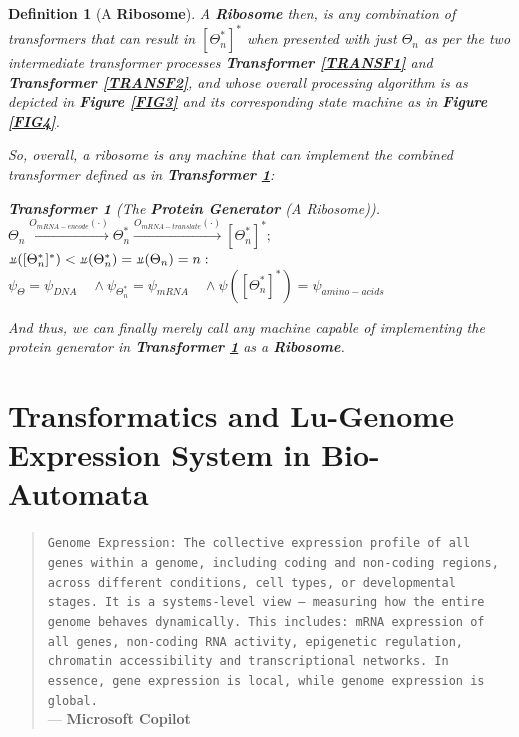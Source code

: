 \documentclass[a4paper, 18pt]{book} %
\newtheorem{defn}{Definition}
\newtheorem{transf}{Transformer}
\newcommand{\invpi}{\rotatebox[origin=c]{180}{$\pi$}}
\begin{document}
\begin{defn}[A \textbf{Ribosome}]
A \textbf{Ribosome} then, is any combination of transformers that can result in $[\Theta^*_n]^*$ when presented with just $\Theta_n$ as per the two intermediate transformer processes \textbf{Transformer \ref{TRANSF1}} and \textbf{Transformer \ref{TRANSF2}}, and whose overall processing algorithm is as depicted in \textbf{Figure \ref{FIG3}} and its corresponding state machine as in \textbf{Figure \ref{FIG4}}. 

So, overall, a ribosome is any machine that can implement the combined transformer defined as in \textbf{Transformer \ref{TRANSF3}}:

\begin{transf}[The \textbf{Protein Generator} (A Ribosome)]
\label{TRANSF3}
$\Theta_n  \xrightarrow{O_{mRNA-encode}(\cdot)}  \Theta^*_n  \xrightarrow{O_{mRNA-translate}(\cdot)} [\Theta^*_n]^*;$\\
$\invpi([\Theta^*_n]^*) < \invpi(\Theta^*_n) = \invpi(\Theta_n) = n:$\\
$\psi_{\Theta} = \psi_{DNA} \quad \land \psi_{\Theta^*_n} = \psi_{mRNA} \quad \land \psi([\Theta^*_n]^*) = \psi_{amino-acids}$
\end{transf}

And thus, we can finally merely call any machine capable of implementing the protein generator  in \textbf{Transformer \ref{TRANSF3}} as a \textbf{Ribosome}.

\end{defn}


\chapter{Transformatics and Lu-Genome Expression System in Bio-Automata}
\label{SEC4}

\begin{quotation}
\noindent \texttt{Genome Expression: The collective expression profile of all genes within a genome, including coding and non-coding regions, across different conditions, cell types, or developmental stages. It is a systems-level view --- measuring how the entire genome behaves dynamically. This includes: mRNA expression of all genes, non-coding RNA activity, epigenetic regulation, chromatin accessibility and transcriptional networks. In essence, gene expression is local, while genome expression is global.}\\
\hspace*{\fill} --- \textbf{Microsoft Copilot}\cite{copilot_dna_assistant}
\end{quotation}
\end{document}

